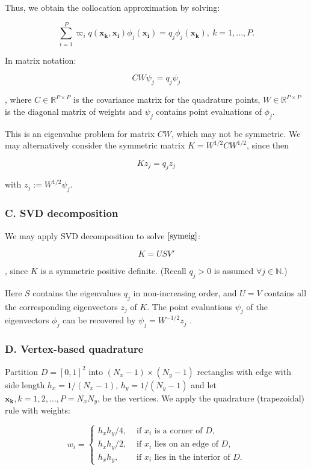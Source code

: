 \documentclass[
]{article}
\begin{document}
Thus, we obtain the collocation approximation by solving:

\[\sum^{P}_{i=1}\varpi_i q(\mathbf{x_k},\mathbf{x_i})\phi_j(\mathbf{x_i})=q_j\phi_j(\mathbf{x_k}), \ k=1,...,P.\]

In matrix notation:

\[CW\psi_j=q_j\psi_j\]

, where \(C\in \mathbb{R}^{P\times P}\) is the covariance matrix for the
quadrature points, \(W\in \mathbb{R}^{P\times P}\) is the diagonal
matrix of weights and \(\psi_j\) contains point evaluations of
\(\phi_j\).

This is an eigenvalue problem for matrix \(CW\), which may not be
symmetric. We may alternatively consider the symmetric matrix
\(K=W^{1/2}CW^{1/2}\), since then

\[Kz_j=q_jz_j \label{symeig}\]

with \(z_j:=W^{1/2}\psi_j\).

\hypertarget{header-n207}{%
\subsubsection{C. SVD decomposition}\label{header-n207}}

We may apply SVD decomposition to solve \(\eqref{symeig}\):

\[K=USV'\]

, since \(K\) is a symmetric positive definite. (Recall \(q_j>0\) is
assumed \(\forall j\in \mathbb{N}\).)

Here \(S\) contains the eigenvalues \(q_j\) in non-increasing order, and
\(U=V\) contains all the corresponding eigenvectors \(z_j\) of \(K\).
The point evaluations \(\psi_j\) of the eigenvectors \(\phi_j\) can be
recovered by \(\psi_j=W^{-1/2}z_j\) .

\hypertarget{header-n220}{%
\subsubsection{D. Vertex-based quadrature}\label{header-n220}}

Partition \(D=[0,1]^2\) into \((N_x-1)\times (N_y-1)\) rectangles with
edge with side length \(h_x=1/(N_x-1)\), \(h_y=1/(N_y-1)\) and let
\(\mathbf{x_k}, k=1,2,…,P=N_xN_y\), be the vertices. We apply the
quadrature (trapezoidal) rule with weights:

\[w_{i}=\left\{\begin{array}{ll}{h_xh_y/ 4,} & {\text { if } x_{i} \text { is a corner of } D,} \\ {h_xh_y / 2,} & {\text { if } x_{i} \text { lies on an edge of } D,} \\ {h_xh_y,} & {\text { if } x_{i} \text { lies in the interior of } D.}\end{array}\right.\]
\end{document}

